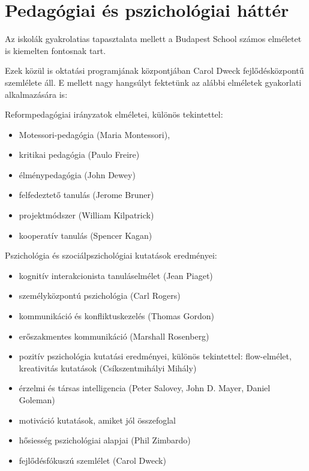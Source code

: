 \section{Pedagógiai és pszichológiai háttér}

Az iskolák gyakrolatias tapasztalata mellett a Budapest School számos
elméletet is kiemelten fontosnak tart.

Ezek közül is oktatási programjának központjában Carol Dweck
fejlődésközpontű szemlélete áll. E mellett nagy hangsúlyt fektetünk az
alábbi elméletek gyakorlati alkalmazására is:

Reformpedagógiai irányzatok elméletei, különös tekintettel:

\begin{itemize}

      \item
            Motessori-pedagógia (Maria Montessori),
      \item
            kritikai pedagógia (Paulo Freire)
      \item
            élménypedagógia (John Dewey)
      \item
            felfedeztető tanulás (Jerome Bruner)
      \item
            projektmódszer (William Kilpatrick)
      \item
            kooperatív tanulás (Spencer Kagan)
\end{itemize}

Pszichológia és szociálpszichológiai kutatások eredményei:

\begin{itemize}

      \item
            kognitív interakcionista tanuláselmélet (Jean Piaget)
      \item
            személyközpontú pszichológia (Carl Rogers)
      \item
            kommunikáció és konfliktuskezelés (Thomas Gordon)
      \item
            erőszakmentes kommunikáció (Marshall Rosenberg)
      \item
            pozitív pszichológia kutatási eredményei, különös tekintettel:
            flow-elmélet, kreativitás kutatások (Csíkszentmihályi Mihály)
      \item
            érzelmi és társas intelligencia (Peter Salovey, John D. Mayer,
            Daniel
            Goleman)
      \item motiváció kutatások, amiket jól összefoglal \citep{pink2011drive}
      \item
            hősiesség pszichológiai alapjai (Phil Zimbardo)
      \item
            fejlődésfókuszú szemlélet (Carol Dweck)
\end{itemize}

